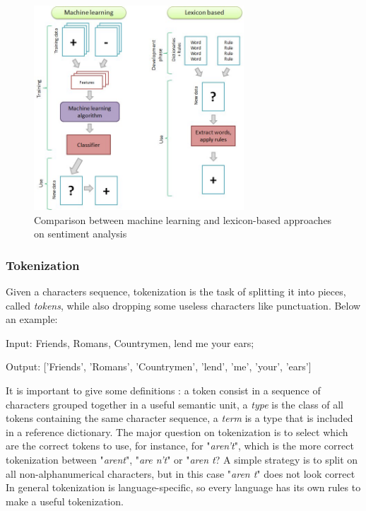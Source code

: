 \begin{figure}[ht]
	\centering
	\includegraphics[width=0.7\textwidth]{figures/Machine-learning-and-lexicon-based-approaches-to-sentiment-analysis.jpg}
	\caption{Comparison between machine learning and lexicon-based approaches on sentiment analysis}
	\label{fig:mllbapp}
\end{figure}

\subsubsection{Tokenization}
Given a characters sequence, tokenization is the task of splitting it into pieces, called \textit{tokens}, while also dropping some useless characters like punctuation. Below an example:
\begin{description}
\item Input: Friends, Romans, Countrymen, lend me your ears;
\item Output: ['Friends', 'Romans', 'Countrymen', 'lend', 'me', 'your', 'ears']
\end{description}
It is important to give some definitions \cite{Manning:2008:IIR:1394399}: a token consist in a sequence of characters grouped together in a useful semantic unit, a \textit{type} is the class of all tokens containing the same character sequence, a \textit{term} is a type that is included in a reference dictionary. The major question on tokenization is to select which are the correct tokens to use, for instance, for "\textit{aren't}", which is the more correct tokenization between "\textit{arent}", "\textit{are n't}" or "\textit{aren t}? A simple strategy is to split on all non-alphanumerical characters, but in this case "\textit{aren t}" does not look correct
In general tokenization is language-specific, so every language has its own rules to make a useful tokenization.

